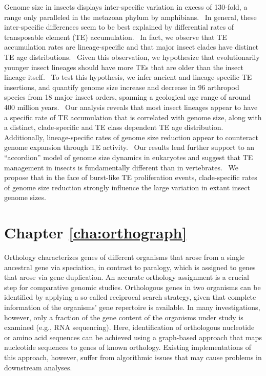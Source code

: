 Genome size in insects displays inter-specific variation in excess of
130-fold, a range only paralleled in the metazoan phylum by amphibians.~
In general, these inter-specific differences seem to be best explained
by differential rates of transposable element (TE) accumulation.~ In
fact, we observe that TE accumulation rates are lineage-specific and
that major insect clades have distinct TE age distributions.~ Given this
observation, we hypothesize that evolutionarily younger insect lineages
should have more TEs that are older than the insect lineage itself.~ To
test this hypothesis, we infer ancient and lineage-specific TE
insertions, and quantify genome size increase and decrease in 96
arthropod species from 18 major insect orders, spanning a geological age
range of around 400 million years.~ Our analysis reveals that most
insect lineages appear to have a specific rate of TE accumulation that
is correlated with genome size, along with a distinct, clade-specific
and TE class dependent TE age distribution.~ Additionally,
lineage-specific rates of genome size reduction appear to counteract
genome expansion through TE activity.~ Our results lend further support
to an ``accordion'' model of genome size dynamics in eukaryotes and
suggest that TE management in insects is fundamentally different than in
vertebrates.~ We propose that in the face of burst-like TE proliferation
events, clade-specific rates of genome size reduction strongly influence
the large variation in extant insect genome sizes.%

\section*{Chapter \ref{cha:orthograph}}

Orthology characterizes genes of different organisms that arose from a
single ancestral gene via speciation, in contrast to paralogy, which is
assigned to genes that arose via gene duplication. An accurate orthology
assignment is a crucial step for comparative genomic studies.
Orthologous genes in two organisms can be identified by applying a
so-called reciprocal search strategy, given that complete information of
the organisms' gene repertoire is available. In many investigations,
however, only a fraction of the gene content of the organisms under
study is examined (e.g., RNA sequencing).  Here, identification of
orthologous nucleotide or amino acid sequences can be achieved using a
graph-based approach that maps nucleotide sequences to genes of known
orthology. Existing implementations of this approach, however, suffer
from algorithmic issues that may cause problems in downstream analyses.

